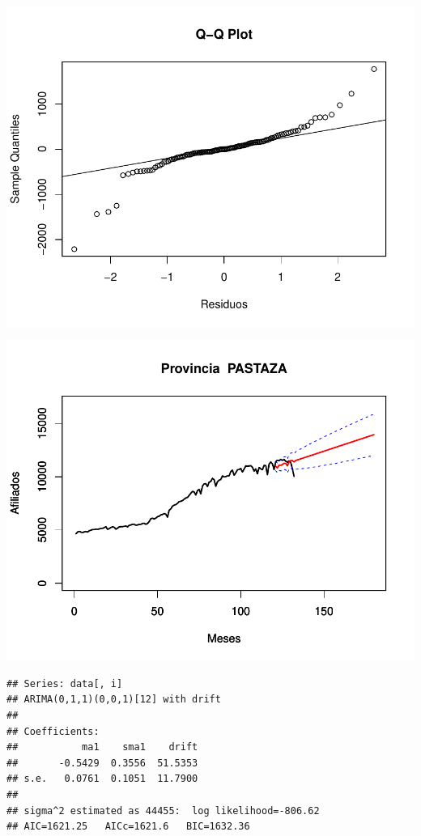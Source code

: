 \documentclass[11pt,a4paper,oneside]{article}\usepackage[]{graphicx}\usepackage[]{color}
\makeatletter
\def\maxwidth{ %
  \ifdim\Gin@nat@width>\linewidth
    \linewidth
  \else
    \Gin@nat@width
  \fi
}
\newenvironment{kframe}{%
 \def\at@end@of@kframe{}%
 \ifinner\ifhmode%
  \def\at@end@of@kframe{\end{minipage}}%
  \begin{minipage}{\columnwidth}%
 \fi\fi%
 \def\FrameCommand##1{\hskip\@totalleftmargin \hskip-\fboxsep
 \colorbox{shadecolor}{##1}\hskip-\fboxsep
     \hskip-\linewidth \hskip-\@totalleftmargin \hskip\columnwidth}%
 \MakeFramed {\advance\hsize-\width
   \@totalleftmargin\z@ \linewidth\hsize
   \@setminipage}}%
 {\par\unskip\endMakeFramed%
 \at@end@of@kframe}
\newenvironment{knitrout}{}{} %
\makeatother
\begin{document}
\begin{knitrout}
{}




{\centering \includegraphics[width=\maxwidth]{figure/unnamed-chunk-16-51} 

}




{\centering \includegraphics[width=\maxwidth]{figure/unnamed-chunk-16-52} 

}


\begin{kframe}\begin{verbatim}
## Series: data[, i] 
## ARIMA(0,1,1)(0,0,1)[12] with drift         
## 
## Coefficients:
##           ma1    sma1    drift
##       -0.5429  0.3556  51.5353
## s.e.   0.0761  0.1051  11.7900
## 
## sigma^2 estimated as 44455:  log likelihood=-806.62
## AIC=1621.25   AICc=1621.6   BIC=1632.36
\end{verbatim}
\end{kframe}


\end{knitrout}
\end{document}
